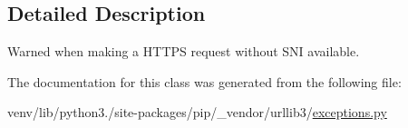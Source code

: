 \subsection{Detailed Description}
\begin{DoxyVerb}Warned when making a HTTPS request without SNI available.\end{DoxyVerb}
 

The documentation for this class was generated from the following file\+:\begin{DoxyCompactItemize}
\item 
venv/lib/python3./site-\/packages/pip/\+\_\+vendor/urllib3/\hyperlink{pip_2__vendor_2urllib3_2exceptions_8py}{exceptions.\+py}\end{DoxyCompactItemize}
